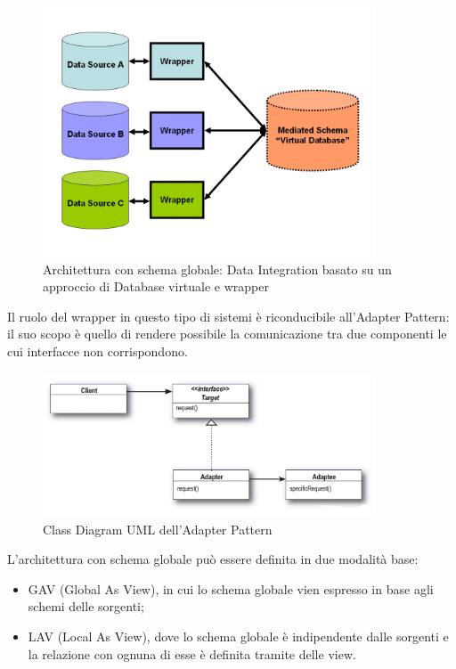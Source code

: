 \documentclass[12pt]{report}
\begin{document}
\begin{figure}[H]
    \centering
    \includegraphics[width=280pt]{Dataintegration+Wrapper.jpg}
    \caption{Architettura con schema globale: Data Integration basato su un approccio di Database virtuale e wrapper}
    \label{fig:Data_Integration_Wrapper}
\end{figure}

Il ruolo del wrapper in questo tipo di sistemi è riconducibile all'Adapter Pattern: il suo scopo è quello di rendere possibile la comunicazione tra due componenti le cui interfacce non corrispondono.

\begin{figure}[H]
    \centering
    \includegraphics[width=280pt]{Adapter.jpg}
    \caption{Class Diagram UML dell'Adapter Pattern}
    \label{fig:Adapter_Pattern}
\end{figure}

L'architettura con schema globale può essere definita in due modalità base:
\begin{itemize}
\item GAV (Global As View), in cui lo schema globale vien espresso in base agli schemi delle sorgenti;
\item LAV (Local As View), dove lo schema globale è indipendente dalle sorgenti e la relazione con ognuna di esse è definita tramite delle view. 
\end{itemize}
\end{document}
